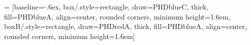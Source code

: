  = [baseline=-.6ex,
box/.style={rectangle, draw=PHDblueC, thick, fill=PHDblueA,
	align=center, rounded corners, minimum height=1.6em},
boxB/.style={rectangle, draw=PHDredA, thick, fill=PHDblueA,
	align=center, rounded corners, minimum height=1.6em}]